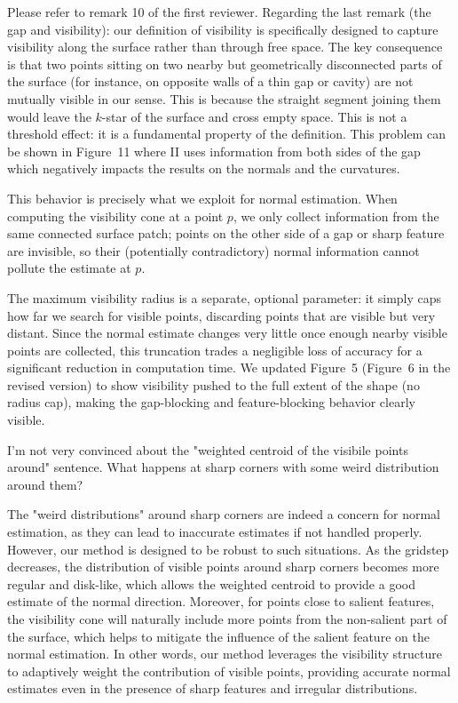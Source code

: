 \documentclass[10pt,french]{letter}
\begin{document}
  \begin{response}
    Please refer to remark 10 of the first reviewer.
    Regarding the last remark (the gap and visibility): our definition of visibility is
    specifically designed to capture visibility along the surface rather than through free
    space. The key consequence is that two points sitting on two nearby but geometrically
    disconnected parts of the surface (for instance, on opposite walls of a thin gap or
    cavity) are not mutually visible in our sense. This is because the straight segment
    joining them would leave the $k$-star of the surface and cross empty space. This is
    not a threshold effect: it is a fundamental property of the definition. This problem
    can be shown in Figure~11 where II uses information from both sides of the gap which
    negatively impacts the results on the normals and the curvatures.

    This behavior is precisely what we exploit for normal estimation. When computing the visibility
    cone at a point $p$, we only collect information from the same connected surface patch; points
    on the other side of a gap or sharp feature are invisible, so their (potentially contradictory)
    normal information cannot pollute the estimate at $p$.

    The maximum visibility radius is a separate, optional parameter: it simply
    caps how far we search for visible points, discarding points that are visible but very distant.
    Since the normal estimate changes very little once enough nearby visible points are collected,
    this truncation trades a negligible loss of accuracy for a significant reduction in computation
    time. We updated Figure~5 (Figure~6 in the revised version) to show visibility pushed to the full extent of
    the shape (no radius cap), making the gap-blocking and feature-blocking behavior clearly visible.
  \end{response}

  \begin{remark}
    I'm not very convinced about the "weighted centroid of the visibile points
    around" sentence. What happens at sharp corners with some weird distribution
    around them?
  \end{remark}
  \begin{response}
    The "weird distributions" around sharp corners are indeed a concern for normal estimation, as they
    can lead to inaccurate estimates if not handled properly. However, our method is designed to be robust
    to such situations. As the gridstep decreases, the distribution of visible points around sharp corners
    becomes more regular and disk-like, which allows the weighted centroid to provide a good estimate of
    the normal direction. Moreover, for points close to salient features, the visibility cone will naturally
    include more points from the non-salient part of the surface, which helps to mitigate the influence
    of the salient feature on the normal estimation. In other words, our method leverages the visibility
    structure to adaptively weight the contribution of visible points, providing accurate normal estimates
    even in the presence of sharp features and irregular distributions.
  \end{response}
\end{document}
